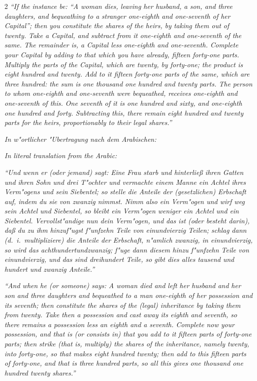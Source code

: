 \documentclass[10pt,a4paper]{article}
\newcommand{\enquote}[1]{``#1''}
\begin{document}
\begin{paracol}{2}
\textit{\enquote{If the instance be: \enquote{A woman dies, leaving her husband, a son, and three daughters, and bequeathing to a stranger one-eighth and one-seventh of her Capital}; then you constitute the shares of the heirs, by taking them out of twenty. Take a Capital, and subtract from it one-eighth and one-seventh of the same. The remainder is, a Capital less one-eighth and one-seventh. Complete your Capital by adding to that which you have already, fifteen forty-one parts. Multiply the parts of the Capital, which are twenty, by forty-one; the product is eight hundred and twenty. Add to it fifteen forty-one parts of the same, which are three hundred: the sum is one thousand one hundred and twenty parts. The person to whom one-eighth and one-seventh were bequeathed, receives one-eighth and one-seventh of this. One seventh of it is one hundred and sixty, and one-eighth one hundred and forty. Subtracting this, there remain eight hundred and twenty parts for the heirs, proportionably to their legal shares.}}

\switchcolumn*

\textit{In w"ortlicher "Ubertragung nach dem Arabischen:}

\switchcolumn

\textit{In literal translation from the Arabic:}

\switchcolumn*

\textit{\enquote{Und wenn er (oder jemand) sagt: Eine Frau starb und hinterlie\ss{} ihren Gatten und ihren Sohn und drei T"ochter und vermachte einem Manne ein Achtel ihres Verm"ogens und sein Siebentel; so stelle die Anteile der (gesetzlichen) Erbschaft auf, indem du sie von zwanzig nimmst. Nimm also ein Verm"ogen und wirf weg sein Achtel und Siebentel, so bleibt ein Verm"ogen weniger ein Achtel und ein Siebentel. Vervollst"andige nun dein Verm"ogen, und das ist (oder besteht darin), da\ss{} du zu ihm hinzuf"ugst f"unfzehn Teile von einundvierzig Teilen; schlag dann (d.\ i.\ multipliziere) die Anteile der Erbschaft, n"amlich zwanzig, in einundvierzig, so wird das achthundertundzwanzig; f"uge dann diesem hinzu f"unfzehn Teile von einundvierzig, und das sind dreihundert Teile, so gibt dies alles tausend und hundert und zwanzig Anteile.}}

\switchcolumn

\textit{\enquote{And when he (or someone) says: A woman died and left her husband and her son and three daughters and bequeathed to a man one-eighth of her possession and its seventh; then constitute the shares of the (legal) inheritance by taking them from twenty. Take then a possession and cast away its eighth and seventh, so there remains a possession less an eighth and a seventh. Complete now your possession, and that is (or consists in) that you add to it fifteen parts of forty-one parts; then strike (that is, multiply) the shares of the inheritance, namely twenty, into forty-one, so that makes eight hundred twenty; then add to this fifteen parts of forty-one, and that is three hundred parts, so all this gives one thousand one hundred twenty shares.}}


\end{paracol}
\end{document}
